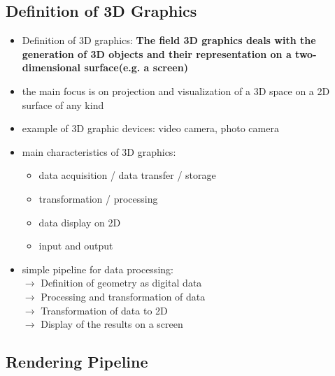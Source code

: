 \documentclass{standalone}
\begin{document}
\subsection{Definition of 3D Graphics}

\begin{itemize}
	\item Definition of 3D graphics: \textbf{The field 3D graphics deals with the generation of 3D objects and their representation on a two-dimensional surface(e.g. a screen)}
	\item the main focus is on projection and visualization of a 3D space on a 2D surface of any kind
	\item example of 3D graphic devices: video camera, photo camera
	\item main characteristics of 3D graphics:
	\begin{itemize}
		\item data acquisition / data transfer / storage
		\item transformation / processing
		\item data display on 2D
		\item input and output
	\end{itemize}
	\item simple pipeline for data processing: \\
		$\rightarrow$ Definition of geometry as digital data \\
		$\rightarrow$ Processing and transformation of data \\
		$\rightarrow$ Transformation of data to 2D \\
		$\rightarrow$ Display of the results on a screen
\end{itemize}

\subsection{Rendering Pipeline}
\end{document}
